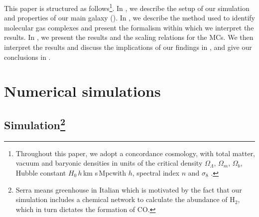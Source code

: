 \IfFileExists{emulateapjlegacy.cls}{\documentclass[iop]{emulateapjlegacy}}{\documentclass[iop]{emulateapj}}
\begin{document}
This paper is structured as follows\footnote{Throughout this paper, we adopt a concordance cosmology, with total matter, vacuum and baryonic densities in units of the critical density $\Omega_{\Lambda}$, $\Omega_m$, $\Omega_b$, Hubble constant $H_0$\,$h$\,km s\pmOne\,Mpc\pmOne with $h$, spectral index $n$ and $\sigma_8$ \citep{Planck14a}.}. In , we describe the setup of our simulation and properties of our main galaxy (\flower). In , we describe the method used to identify molecular gas complexes and present the formalism within which we interpret the results. In , we present the results and the scaling relations for the MCs. We then interpret the results and discuss the implications of our findings in , and give our conclusions in .
%

\section{Numerical simulations} \label{sec:sim}

\subsection{ Simulation\footnote{Serra means greenhouse in Italian which is motivated by the
fact that our simulation includes a chemical network to calculate the abundance of H$_2$, which in turn
dictates the formation of CO.
}}
\end{document}
